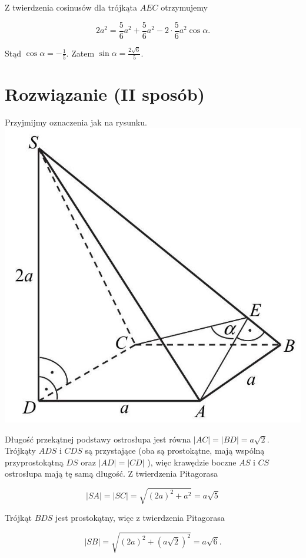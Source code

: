 \documentclass[10pt]{article}
\begin{document}
Z twierdzenia cosinusów dla trójkąta $A E C$ otrzymujemy

$$
2 a^{2}=\frac{5}{6} a^{2}+\frac{5}{6} a^{2}-2 \cdot \frac{5}{6} a^{2} \cos \alpha .
$$

Stąd $\cos \alpha=-\frac{1}{5}$. Zatem $\sin \alpha=\frac{2 \sqrt{6}}{5}$.

\section*{Rozwiązanie (II sposób)}
Przyjmijmy oznaczenia jak na rysunku.\\
\includegraphics[max width=\textwidth, center]{2025_02_07_f5f4e8f37e6baab02e47g-23}

Długość przekątnej podstawy ostrosłupa jest równa $|A C|=|B D|=a \sqrt{2}$.\\
Trójkąty $A D S$ i $C D S$ są przystające (oba są prostokątne, mają wspólną przyprostokątną $D S$ oraz $|A D|=|C D|$ ), więc krawędzie boczne $A S$ i $C S$ ostrosłupa mają tę samą długość. Z twierdzenia Pitagorasa

$$
|S A|=|S C|=\sqrt{(2 a)^{2}+a^{2}}=a \sqrt{5}
$$

Trójkąt $B D S$ jest prostokątny, więc z twierdzenia Pitagorasa

$$
|S B|=\sqrt{(2 a)^{2}+(a \sqrt{2})^{2}}=a \sqrt{6} .
$$
\end{document}
